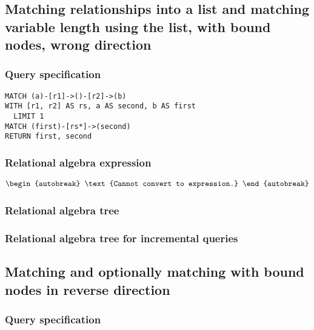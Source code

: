 
\subsection{Matching relationships into a list and matching variable length using the list, with bound nodes, wrong direction}

\subsubsection*{Query specification}

\begin{lstlisting}
MATCH (a)-[r1]->()-[r2]->(b)
WITH [r1, r2] AS rs, a AS second, b AS first
  LIMIT 1
MATCH (first)-[rs*]->(second)
RETURN first, second
\end{lstlisting}

\subsubsection*{Relational algebra expression}

\begin{align*}
\begin{autobreak}
\text{Cannot convert to expression.}
\end{autobreak}
\end{align*}

\subsubsection*{Relational algebra tree}


\subsubsection*{Relational algebra tree for incremental queries}


\subsection{Matching and optionally matching with bound nodes in reverse direction}

\subsubsection*{Query specification}

